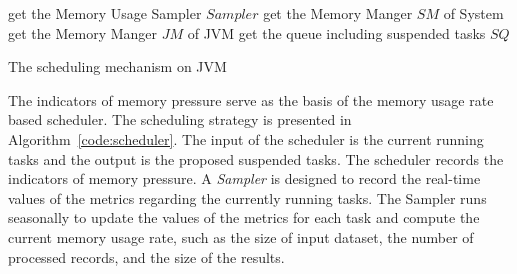 \IncMargin{0.4em}
\SetAlFnt{\small}
\begin{algorithm}[!t]


get the Memory Usage Sampler $Sampler$\;
get the Memory Manger $SM$ of System\;
get the Memory Manger $JM$ of JVM\;
get the queue including suspended tasks $SQ$\;
\lElse{\CST}

\BlankLine
{}
\BlankLine
{}
\caption{The scheduling mechanism on JVM}
\label{code:scheduler}
\end{algorithm}

The indicators of memory pressure serve as the basis of the memory usage rate based scheduler. The scheduling strategy is presented in Algorithm~\ref{code:scheduler}. The input of the scheduler is the current running tasks and the output is the proposed suspended tasks. The scheduler records the indicators of memory pressure. A \textit{Sampler} is designed to record the real-time values of the metrics regarding the currently running tasks. The Sampler runs seasonally to update the values of the metrics for each task and compute the current memory usage rate, such as the size of input dataset, the number of processed records, and the size of the results.

